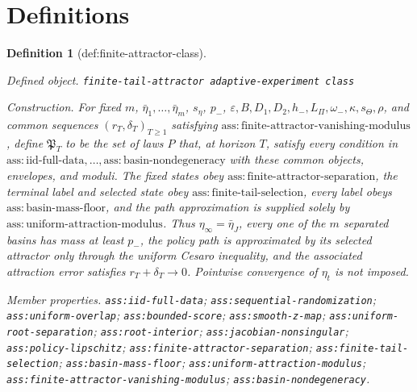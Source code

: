 \documentclass{article}
\newtheorem{definition}{Definition}
\begin{document}
\section{Definitions}

\begin{definition}[def:finite-attractor-class]\label{def:finite-attractor-class}
\par\smallskip\noindent\emph{Defined object.} \texttt{finite-\allowbreak{}tail-\allowbreak{}attractor adaptive-\allowbreak{}experiment class}
\par\smallskip\noindent\emph{Construction.} For fixed \(m\), \(\bar\eta_1,\ldots,\bar\eta_m\), \(s_\eta\), \(p_-\), \(\varepsilon,B,D_1,D_2,h_-,L_\Pi,\omega_-,\kappa,s_\Theta,\rho\), and common sequences \((r_T,\delta_T)_{T\ge1}\) satisfying \(\mathrm{ass:finite\text{-}attractor\text{-}vanishing\text{-}modulus}\), define \(\mathfrak P_T\) to be the set of laws \(P\) that, at horizon \(T\), satisfy every condition in \(\mathrm{ass:iid\text{-}full\text{-}data},\ldots,\mathrm{ass:basin\text{-}nondegeneracy}\) with these common objects, envelopes, and moduli. The fixed states obey \(\mathrm{ass:finite\text{-}attractor\text{-}separation}\), the terminal label and selected state obey \(\mathrm{ass:finite\text{-}tail\text{-}selection}\), every label obeys \(\mathrm{ass:basin\text{-}mass\text{-}floor}\), and the path approximation is supplied solely by \(\mathrm{ass:uniform\text{-}attraction\text{-}modulus}\). Thus \(\eta_\infty=\bar\eta_J\), every one of the \(m\) separated basins has mass at least \(p_-\), the policy path is approximated by its selected attractor only through the uniform Cesaro inequality, and the associated attraction error satisfies \(r_T+\delta_T\to0\). Pointwise convergence of \(\eta_t\) is not imposed.
\par\smallskip\noindent\emph{Member properties.} \texttt{ass:\allowbreak{}iid-\allowbreak{}full-\allowbreak{}data}; \texttt{ass:\allowbreak{}sequential-\allowbreak{}randomization}; \texttt{ass:\allowbreak{}uniform-\allowbreak{}overlap}; \texttt{ass:\allowbreak{}bounded-\allowbreak{}score}; \texttt{ass:\allowbreak{}smooth-\allowbreak{}z-\allowbreak{}map}; \texttt{ass:\allowbreak{}uniform-\allowbreak{}root-\allowbreak{}separation}; \texttt{ass:\allowbreak{}root-\allowbreak{}interior}; \texttt{ass:\allowbreak{}jacobian-\allowbreak{}nonsingular}; \texttt{ass:\allowbreak{}policy-\allowbreak{}lipschitz}; \texttt{ass:\allowbreak{}finite-\allowbreak{}attractor-\allowbreak{}separation}; \texttt{ass:\allowbreak{}finite-\allowbreak{}tail-\allowbreak{}selection}; \texttt{ass:\allowbreak{}basin-\allowbreak{}mass-\allowbreak{}floor}; \texttt{ass:\allowbreak{}uniform-\allowbreak{}attraction-\allowbreak{}modulus}; \texttt{ass:\allowbreak{}finite-\allowbreak{}attractor-\allowbreak{}vanishing-\allowbreak{}modulus}; \texttt{ass:\allowbreak{}basin-\allowbreak{}nondegeneracy}.
\end{definition}
\end{document}
